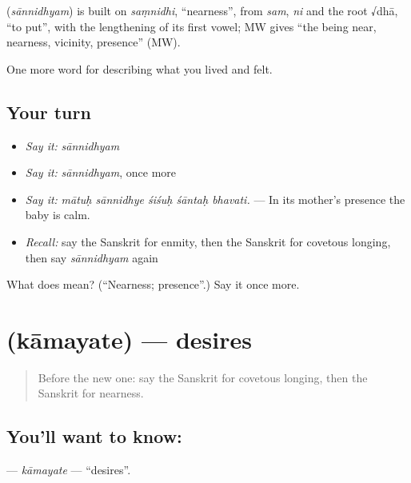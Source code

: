 \begin{cousinweb}
\textbf{} (\emph{sānnidhyam}) is built on \emph{saṃnidhi}, \textquotedblleft{}nearness\textquotedblright{}, from \emph{sam}, \emph{ni} and the root √dhā, \textquotedblleft{}to put\textquotedblright{}, with the lengthening of its first vowel; MW gives \textquotedblleft{}the being near, nearness, vicinity, presence\textquotedblright{} (MW).
\end{cousinweb}

\begin{grammarlens}[title={What you've built}]
One more word for describing what you lived and felt.
\end{grammarlens}

\subsection*{Your turn}
\begin{itemize}
\raggedright
  \item \emph{Say it:} \emph{sānnidhyam}
  \item \emph{Say it:} \emph{sānnidhyam}, once more
  \item \emph{Say it:} \emph{mātuḥ sānnidhye śiśuḥ śāntaḥ bhavati.} — In its mother's presence the baby is calm.
  \item \emph{Recall:} say the Sanskrit for enmity, then the Sanskrit for covetous longing, then say \emph{sānnidhyam} again
\end{itemize}

\begin{tcolorbox}[breakable,colback=teal!4,colframe=teal!35!black,title={Before you move on}]
What does  mean? (\textquotedblleft{}Nearness; presence\textquotedblright{}.) Say it once more.
\end{tcolorbox}
\section[\texorpdfstring{\sk{कामयते} (kāmayate)}{कामयते (kāmayate)}]{ (kāmayate) — desires}

\label{lesson:SA-C455-kamayate}



\begin{quote}
Before the new one: say the Sanskrit for covetous longing, then the Sanskrit for nearness.
\end{quote}

\subsection*{You'll want to know: }
\textbf{} — \emph{kāmayate} — \textquotedblleft{}desires\textquotedblright{}.


